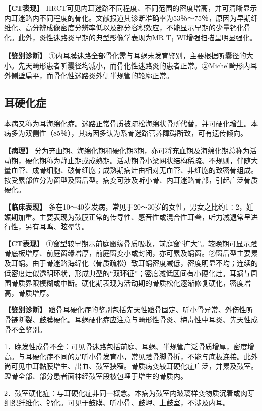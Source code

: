 \textbf{【CT表现】}
HRCT可见内耳迷路不同程度、不同范围的密度增高，并可清晰显示内耳迷路内不同程度的骨化。文献报道其诊断准确率为53％～75％，原因为早期纤维化、高分辨成像密度分辨率低以及部分容积效应，不能显示早期的少量钙化骨化。此外，炎性迷路炎早期的典型影像学表现为MR
T\textsubscript{1} WI增强扫描呈明显强化。

\textbf{【鉴别诊断】}
①内耳膜迷路全部骨化需与耳蜗未发育鉴别，主要根据听囊径的大小。先天畸形患者听囊径均减小，而骨化性迷路炎的患者正常。②Michel畸形内耳外侧壁扁平，而骨化性迷路炎外侧半规管的轮廓正常。

\subsection{耳硬化症}

本病又称为耳海绵化症。迷路正常骨质被疏松海绵状骨所代替，并可硬化增生。本病多为双侧性（85％），其病因多认为系骨迷路营养障碍所致，可有遗传倾向。

\textbf{【病理】}
分为充血期、海绵化期和硬化期3期，亦可将充血期及海绵化期总称为活动期，硬化期称为静止期或成熟期。活动期骨小梁网状结构稀疏、不规则，伴随大量血管、成骨细胞、破骨细胞；成熟期病灶由相对无血管、非细胞的致密骨组成。按受累部位分为窗型及窗后型。病变可涉及听小骨、内耳迷路骨部，引起广泛骨质硬化。

\textbf{【临床表现】}
多在10～40岁发病，常见于20～30岁的女性，男女之比约1∶2，妊娠期加重。主要表现为鼓膜正常的传导性、感音性或混合性耳聋，听力减退常呈进行性，另有耳鸣、眩晕等。

\textbf{【CT表现】}
①窗型较早期示前庭窗缘骨质吸收，前庭窗“扩大”。较晚期可显示蹬骨底板增厚、前庭窗缘增厚，前庭窗变小或封闭，亦可累及蜗窗。②窗后型主要累及耳蜗。由于骨迷路海绵化（骨质疏松）致耳蜗密度减低，密度明显不均；连续的低密度灶似透明环状，形成典型的“双环征”；密度减低区间有小硬化灶。耳蜗与周围骨质界限模糊或中断。硬化期表现为活动期的骨质松化逐渐修复硬化，密度增高，骨质增厚。

\textbf{【鉴别诊断】}
蹬骨耳硬化症的鉴别包括先天性蹬骨固定、听小骨异常、外伤性听骨链断裂、鼓膜硬化。耳蜗硬化症应注意与畸形性骨炎、梅毒性中耳炎、先天性成骨不全鉴别。

1．晚发性成骨不全：可见骨迷路包括前庭、耳蜗、半规管广泛骨质增厚，密度增高。与耳硬化症不同的是听小骨发育小，常见蹬骨脚骨折，不能与底板连接。此外尚可见中耳黏膜增生、出血、鼓室狭窄。骨质病变较耳硬化症广泛，并累及鼓室。蹬骨全部、部分患者面神经鼓室段被包埋于增生的骨质内。

2．鼓室硬化症：与耳硬化症非同一概念。本病为鼓室内玻璃样变物质沉着或肉芽组织纤维化、钙化。可见于鼓膜、听小骨、鼓岬、上鼓室，不涉及内耳。

